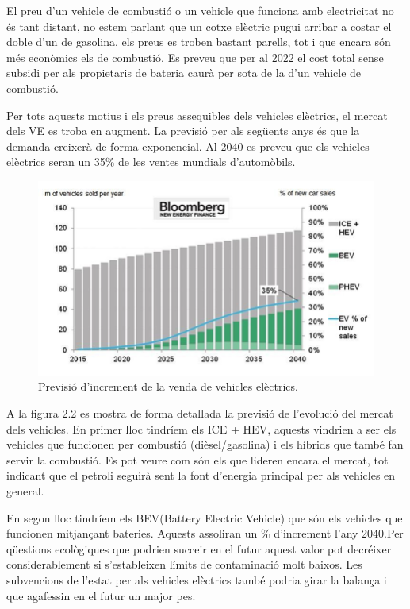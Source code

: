 El preu d'un vehicle de combustió o un vehicle que funciona amb electricitat no és tant distant, no estem parlant que un cotxe elèctric pugui arribar a costar el doble d'un de gasolina, els preus es troben bastant parells, tot i que encara són més econòmics els de combustió. Es preveu que per al 2022 el cost total sense subsidi per als propietaris de bateria caurà per sota de la d'un vehicle de combustió. 

Per tots aquests motius i els preus assequibles dels vehicles elèctrics, el mercat dels VE es troba en augment. La previsió per als següents anys és que la demanda creixerà de forma exponencial. Al 2040 es preveu que els vehicles elèctrics seran un 35\% de les ventes mundials d'automòbils.

\begin{figure}[H]
		\centering
    	\includegraphics[width=\textwidth]{Marcteoric/ev-sales-distrib.png}
     	\caption{Previsió d'increment de la venda de vehicles elèctrics.}
\end{figure}

A la figura 2.2 es mostra de forma detallada la previsió de l'evolució del mercat dels vehicles. En primer lloc tindríem els ICE + HEV, aquests vindrien a ser els vehicles que funcionen per combustió (dièsel/gasolina) i els híbrids que també fan servir la combustió. Es pot veure com són els que lideren encara el mercat, tot indicant que el petroli seguirà sent la font d'energia principal per als vehicles en general. 

En segon lloc tindríem els BEV(Battery Electric Vehicle) que són els vehicles que funcionen mitjançant bateries. Aquests assoliran un \% d'increment l'any 2040.Per qüestions ecològiques que podrien succeir en el futur aquest valor pot decréixer considerablement si s'estableixen límits de contaminació molt baixos. Les subvencions de l'estat per als vehicles elèctrics també podria girar la balança i que agafessin en el futur un major pes.
 

